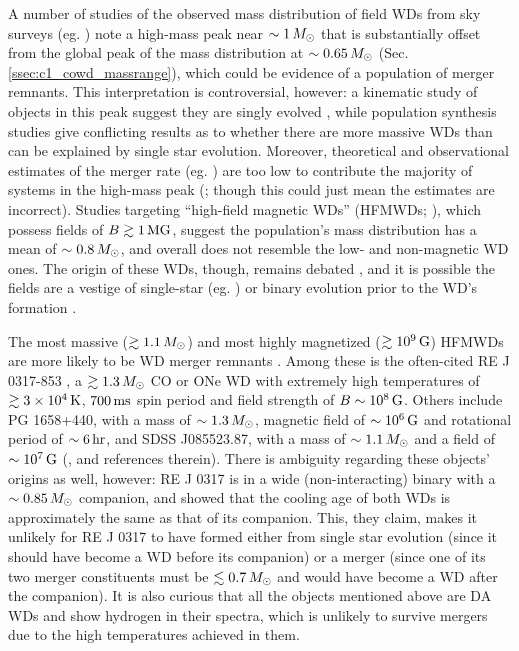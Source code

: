 A number of studies of the observed mass distribution of field WDs from sky surveys (eg. \citealt{liebbh05, giambd12, klei+13, reba+15a, reba+15b}) note a high-mass peak near $\sim1\,\Msun$ that is substantially offset from the global peak of the mass distribution at $\sim0.65\,\Msun$ (Sec. \ref{ssec:c1_cowd_massrange}), which could be evidence of a population of merger remnants.  This interpretation is controversial, however: a kinematic study of objects in this peak suggest they are singly evolved \citep{weggp12}, while population synthesis studies \citep{reba+15a, reba+15b, trem+16} give conflicting results as to whether there are more massive WDs than can be explained by single star evolution.  Moreover, theoretical and observational estimates of the merger rate (eg. \citep{badem12, toonnp12}) are too low to contribute the majority of systems in the high-mass peak (\citealt{giambd12, reba+15b, trem+16}; though this could just mean the estimates are incorrect).  Studies targeting ``high-field magnetic WDs'' (HFMWDs; \citealt{kawk+07, kepl+13, garc+16}), which possess fields of $B \gtrsim1\,\mathrm{MG}$, suggest the population's mass distribution has a mean of $\sim0.8\,\Msun$, and overall does not resemble the low- and non-magnetic WD ones.  The origin of these WDs, though, remains debated \citep{brig+15, garc+16}, and it is possible the fields are a vestige of single-star (eg. \citealt{wickf05, kisst15}) or binary evolution prior to the WD's formation \citep{brig+15}.  

The most massive ($\gtrsim1.1\,\Msun$) and most highly magnetized ($\gtrsim10^9\,\mathrm{G}$) HFMWDs are more likely to be WD merger remnants \citep{garc+12, kule+13, wicktf14}.  Among these is the often-cited RE J 0317-853 \citep{bars+95, kube+10}, a $\gtrsim1.3\,\Msun$ CO or ONe WD with extremely high temperatures of $\gtrsim3\times10^4\,\mathrm{K}$, $700\,\mathrm{ms}$ spin period and field strength of $B\sim10^8\,\mathrm{G}$.  Others include PG 1658+440, with a mass of $\sim1.3\,\Msun$, magnetic field of $\sim10^6\,\mathrm{G}$ and rotational period of $\sim6\,\mathrm{hr}$, and SDSS J085523.87, with a mass of $\sim1.1\,\Msun$ and a field of $\sim10^7\,\mathrm{G}$ (\citealt{ferrdg15}, and references therein).  There is ambiguity regarding these objects' origins as well, however: RE J 0317 is in a wide (non-interacting) binary with a $\sim0.85\,\Msun$ companion, and \cite{kule+10} showed that the cooling age of both WDs is approximately the same as that of its companion.  This, they claim, makes it unlikely for RE J 0317 to have formed either from single star evolution (since it should have become a WD before its companion) or a merger (since one of its two merger constituents must be $\lesssim0.7\,\Msun$ and would have become a WD after the companion).  It is also curious that all the objects mentioned above are DA WDs and show hydrogen in their spectra, which is unlikely to survive mergers due to the high temperatures achieved in them.


